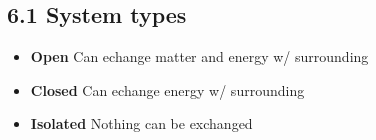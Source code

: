 \subsection{6.1 System types}
    \begin{itemize}
        \itemsep0em
        \item \textbf{Open} Can echange matter and energy w/ surrounding
        \item \textbf{Closed} Can echange energy w/ surrounding
        \item \textbf{Isolated} Nothing can be exchanged
    \end{itemize}